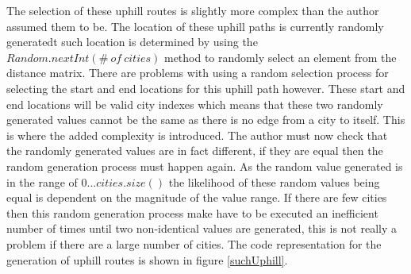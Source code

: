 The selection of these uphill routes is slightly more complex than the author assumed them to be. The location of these uphill paths is currently randomly generatedt such location is determined by using the $Random.nextInt(\#\ of\ cities)$ method to randomly select an element from the distance matrix. There are problems with using a random selection process for selecting the start and end locations for this uphill path however. These start and end locations will be valid city indexes which means that these two randomly generated values cannot be the same as there is no edge from a city to itself. This is where the added complexity is introduced. The author must now check that the randomly generated values are in fact different, if they are equal then the random generation process must happen again. As the random value generated is in the range of $0...cities.size()$ the likelihood of these random values being equal is dependent on the magnitude of the value range. If there are few cities then this random generation process make have to be executed an inefficient number of times until two non-identical values are generated, this is not really a problem if there are a large number of cities. The code representation for the generation of uphill routes is shown in figure \ref{suchUphill}.
